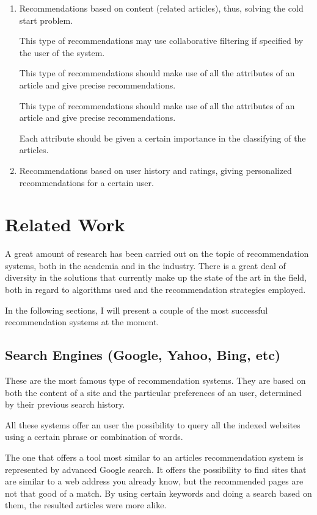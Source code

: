 \begin{enumerate}
  \item Recommendations based on content (related articles), thus, solving the cold start problem.
  
  	This type of recommendations may use collaborative filtering if specified by the user of the system.
    
    This type of recommendations should make use of all the attributes of an article and give precise recommendations.
    
    This type of recommendations should make use of all the attributes of an article and give precise recommendations.
    
    Each attribute should be given a certain importance in the classifying of the articles.
  
  \item Recommendations based on user history and ratings, giving personalized recommendations for a certain user.
\end{enumerate}



\section{Related Work}
\label{sub-sec:related-work}

A great amount of research has been carried out on the topic of recommendation systems, both in the academia and in the industry. There is a great deal of diversity in the solutions that currently make up the state of the art in the field, both in regard to algorithms used and the recommendation strategies employed. 

In the following sections, I will present a couple of the most successful recommendation systems at the moment.
\nocite{*}

\subsection{Search Engines (Google, Yahoo, Bing, etc)}

These are the most famous type of recommendation systems. They are based on both the content of a site and the particular preferences of an user, determined by their previous search history. 

All these systems offer an user the possibility to query all the indexed websites using a certain phrase or combination of words.

The one that offers a tool most similar to an articles recommendation system is represented by advanced Google search. It offers the possibility to find sites that are similar to a web address you already know, but the recommended pages are not that good of a match. By using certain keywords and doing a search based on them, the resulted articles were more alike.

